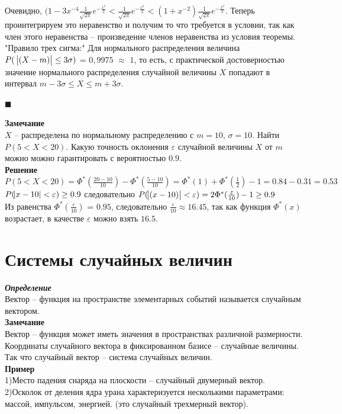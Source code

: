 \documentclass[russian, 12pt, fleqn]{article}
\begin{document}
Очевидно, $(1-3x^{-4}\frac{1}{\sqrt{2\pi}} e^{-\frac{x^2}{2}} < \frac{1}{\sqrt{2\pi}} e ^{- \frac{x^2}{2} } < (1 + x^{-2}) \frac{1}{\sqrt{2\pi}} e^{-\frac{x^2}{2}}$. Теперь проинтегрируем это неравенство  и получим то что требуется в условии, так как член этого неравенства -- произведение членов неравенства из условия теоремы.\\
"Правило трех сигма:" Для нормального распределения величина\\ $P(\ \abs{(X-m)} \leq 3\sigma)$ = $0,9975$ $\approx$ $1$, то есть, с практической достоверностью значение нормального распределения случайной величины $X$ попадают в интервал $m-3\sigma\leq X \leq m+ 3\sigma$.\\
\begin{flushright}\(\blacksquare\)\end{flushright}
\textbf{Замечание\ } \\
$X$ -- распределена по нормальному распределению с $m=10$, $\sigma=10$. Найти $P(5<X<20)$. Какую точность оклонения $\varepsilon$ случайной величины $X$ от $m$ можно можно гарантировать с вероятностью $0.9$.\\
\textbf{Решение}\\
$P(5<X<20)  = \Phi^*(\frac{20 - 10}{10}) - \Phi^*(\frac{5 - 10}{10}) = \Phi^*(1) + \Phi^*(\frac{1}{2}) - 1 = 0.84 - 0.31 = 0.53$\\ 
$P(\abs{x - 10} < \varepsilon) \geq 0.9$ следовательно $P(\abs{(x - 10)} < \varepsilon) = 2\Phi^*(\frac{\varepsilon}{10}) - 1 \geq 0.9$\\
Из равенства $\Phi^*(\frac{\varepsilon}{10}) $ = $0.95$, следовательно $\frac{\varepsilon}{10} \approx 16.45$, так как функция $ \Phi^*(x)$ возрастает, в качестве
 $\varepsilon$ можно взять $16.5$.
\newpage
\section{Системы случайных величин}
\textit{\textbf{Определение}}\\
Вектор -- функция на пространстве элементарных событий называется случайным вектором.\\
\textbf{Замечание\ } \\
Вектор -- функция может иметь значения в пространствах различной размерности.\\
Координаты случайного вектора в фиксированном базисе -- случайные величины. Так что случайный вектор -- система случайных величин.\\
\textbf{Пример}\\
1)Место падения снаряда на плоскости -- случайный двумерный вектор.\\
2)Осколок от деления ядра урана характеризуется несколькими параметрами: массой, импульсом, энергией. (это случайный трехмерный вектор).
\end{document}
